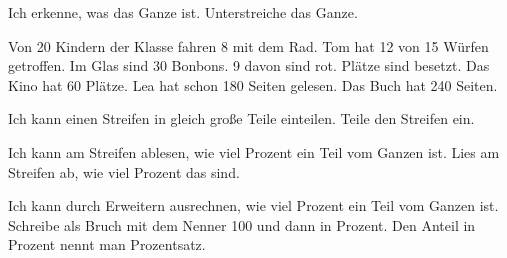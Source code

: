 \setcounter{aufgabe}{11}

\begin{aufgabe}{Ich erkenne, was das Ganze ist.}
Unterstreiche das Ganze.
\begin{teile}
\teil Von 20 Kindern der Klasse fahren 8 mit dem Rad.
\teil Tom hat 12 von 15 Würfen getroffen.
\teil Im Glas sind 30 Bonbons. 9 davon sind rot.
 Plätze sind besetzt. Das Kino hat 60 Plätze.
\teil Lea hat schon 180 Seiten gelesen. Das Buch hat 240 Seiten.
\end{teile}
\end{aufgabe}

\begin{aufgabe}{Ich kann einen Streifen in gleich große Teile einteilen.}
Teile den Streifen ein.

\end{aufgabe}

\begin{aufgabe}{Ich kann am Streifen ablesen, wie viel Prozent ein Teil vom Ganzen ist.}
Lies am Streifen ab, wie viel Prozent das sind.

\end{aufgabe}

\begin{aufgabe}{Ich kann durch Erweitern ausrechnen, wie viel Prozent ein Teil vom Ganzen ist.}
Schreibe als Bruch mit dem Nenner 100 und dann in Prozent. Den Anteil in Prozent nennt man Prozentsatz.

\end{aufgabe}


